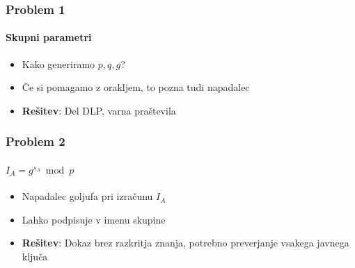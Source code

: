 \documentclass{beamer}    %
\begin{document}
\begin{frame}
    \frametitle{Problem 1}
    \framesubtitle{Skupni parametri}
    \begin{itemize}
        \item Kako generiramo $p, q, g$?
        \item Če si pomagamo z orakljem, to pozna tudi napadalec
        \vspace{1cm}
        \item \textbf{Rešitev}: Del DLP, varna praštevila
    \end{itemize}
\end{frame}

\begin{frame}
    \frametitle{Problem 2}
    \framesubtitle{$I_A = g^{s_A} \bmod p$}
    \begin{itemize}
        \item Napadalec goljufa pri izračunu $I_A$
        \item Lahko podpisuje v imenu skupine
        \vspace{1cm}
        \item \textbf{Rešitev}: Dokaz brez razkritja znanja, potrebno preverjanje 
                vsakega javnega ključa
    \end{itemize}
\end{frame}
\end{document}
